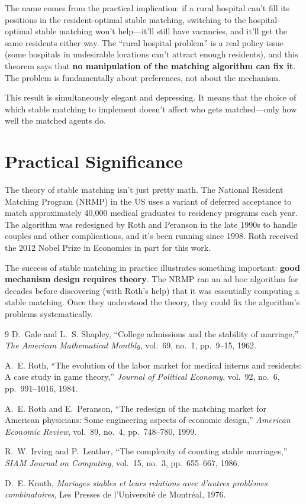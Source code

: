 \documentclass[11pt]{article}
\begin{document}
The name comes from the practical implication: if a rural hospital can't fill its positions in the resident-optimal stable matching, switching to the hospital-optimal stable matching won't help---it'll still have vacancies, and it'll get the same residents either way. The ``rural hospital problem'' is a real policy issue (some hospitals in undesirable locations can't attract enough residents), and this theorem says that \textbf{no manipulation of the matching algorithm can fix it}. The problem is fundamentally about preferences, not about the mechanism.

This result is simultaneously elegant and depressing. It means that the choice of which stable matching to implement doesn't affect who gets matched---only how well the matched agents do.

\section{Practical Significance}

The theory of stable matching isn't just pretty math. The National Resident Matching Program (NRMP) in the US uses a variant of deferred acceptance to match approximately 40,000 medical graduates to residency programs each year. The algorithm was redesigned by Roth and Peranson in the late 1990s to handle couples and other complications, and it's been running since 1998. Roth received the 2012 Nobel Prize in Economics in part for this work.

The success of stable matching in practice illustrates something important: \textbf{good mechanism design requires theory}. The NRMP ran an ad hoc algorithm for decades before discovering (with Roth's help) that it was essentially computing a stable matching. Once they understood the theory, they could fix the algorithm's problems systematically.

\begin{thebibliography}{9}
 D.~Gale and L.~S. Shapley, ``College admissions and the stability of marriage,'' \textit{The American Mathematical Monthly}, vol.~69, no.~1, pp.~9--15, 1962.

 A.~E. Roth, ``The evolution of the labor market for medical interns and residents: A case study in game theory,'' \textit{Journal of Political Economy}, vol.~92, no.~6, pp.~991--1016, 1984.

 A.~E. Roth and E.~Peranson, ``The redesign of the matching market for American physicians: Some engineering aspects of economic design,'' \textit{American Economic Review}, vol.~89, no.~4, pp.~748--780, 1999.

 R.~W. Irving and P.~Leather, ``The complexity of counting stable marriages,'' \textit{SIAM Journal on Computing}, vol.~15, no.~3, pp.~655--667, 1986.

 D.~E. Knuth, \textit{Mariages stables et leurs relations avec d'autres probl\`emes combinatoires}, Les Presses de l'Universit\'e de Montr\'eal, 1976.
\end{thebibliography}
\end{document}

